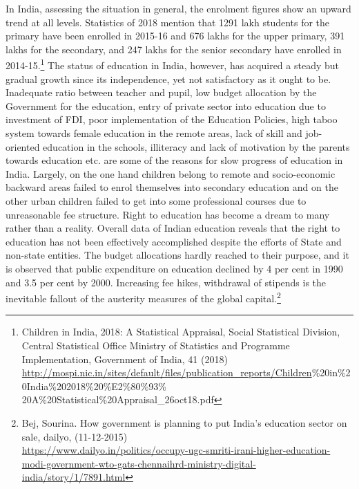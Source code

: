 \begin{multicols}{2}
\noi
In India, assessing the situation in general, the enrolment figures show an upward trend at all
levels. Statistics of 2018 mention that 1291 lakh students for the primary have been enrolled
in 2015-16 and 676 lakhs for the upper primary, 391 lakhs for the secondary, and 247 lakhs
for the senior secondary have enrolled in 2014-15.\footnote{Children in India, 2018: A Statistical Appraisal, Social Statistical Division, Central Statistical Office Ministry of Statistics and Programme Implementation, Government of India, 41 (2018) \url{http://mospi.nic.in/sites/default/files/publication_reports/Children}\%20in\%20India\%202018\%20\%E2\%80\%93\% 20A\%20Statistical\%20Appraisal\_26oct18.pdf} The status of education in India, however, has acquired a steady but gradual growth since its independence, yet not satisfactory as it ought to be. Inadequate ratio between teacher and pupil, low budget
allocation by the Government for the education, entry of private sector into education due to
investment of FDI, poor implementation of the Education Policies, high taboo system
towards female education in the remote areas, lack of skill and job-oriented education in the
schools, illiteracy and lack of motivation by the parents towards education etc. are some of
the reasons for slow progress of education in India. Largely, on the one hand children belong
to remote and socio-economic backward areas failed to enrol themselves into secondary
education and on the other urban children failed to get into some professional courses due to
unreasonable fee structure. Right to education has become a dream to many rather than a
reality. Overall data of Indian education reveals that the right to education has not been
effectively accomplished despite the efforts of State and non-state entities. The budget
allocations hardly reached to their purpose, and it is observed that public expenditure on
education declined by 4 per cent in 1990 and 3.5 per cent by 2000. Increasing fee hikes,
withdrawal of stipends is the inevitable fallout of the austerity measures of the global
capital.\footnote{Bej, Sourina. How government is planning to put India's education sector on sale, dailyo, (11-12-2015)\\
\url{https://www.dailyo.in/politics/occupy-ugc-smriti-irani-higher-education-modi-government-wto-gats-chennaihrd-ministry-digital-india/story/1/7891.html}}

\vspace{-.1cm}


\end{multicols}
